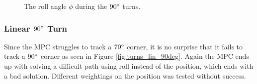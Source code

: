 \begin{figure}
	\caption{The roll angle $\phi$ during the $90\degree$ turns.}
	\label{fig:turns_cur_90deg_roll}
\end{figure}


\subsubsection{Linear $90\degree$ Turn}

Since the MPC struggles to track a $70\degree$ corner, it is no surprise that it fails to track a $90\degree$ corner as seen in Figure \ref{fig:turns_lin_90deg}. Again the MPC ends up with solving a difficult path using roll instead of the position, which ends with a bad solution. Different weightings on the position was tested without success.

